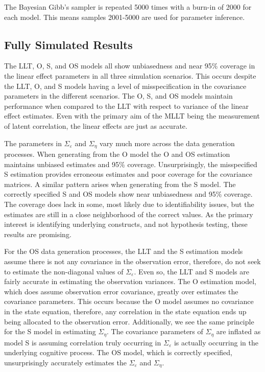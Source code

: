 \documentclass[
]{article}
\begin{document}
The Bayesian Gibb's sampler is repeated 5000 times with a burn-in of 2000 for each model. This means samples 2001-5000 are used for parameter inference.

\hypertarget{fully-simulated-results}{%
\subsection{Fully Simulated Results}\label{fully-simulated-results}}

The LLT, O, S, and OS models all show unbiasedness and near 95\% coverage in the linear effect parameters in all three simulation scenarios. This occurs despite the LLT, O, and S models having a level of misspecification in the covariance parameters in the different scenarios. The O, S, and OS models maintain performance when compared to the LLT with respect to variance of the linear effect estimates. Even with the primary aim of the MLLT being the measurement of latent correlation, the linear effects are just as accurate.

The parameters in \(\Sigma_\varepsilon\) and \(\Sigma_\eta\) vary much more across the data generation processes. When generating from the O model the O and OS estimation maintains unbiased estimates and 95\% coverage. Unsurprisingly, the misspecified S estimation provides erroneous estimates and poor coverage for the covariance matrices. A similar pattern arises when generating from the S model. The correctly specified S and OS models show near unbiasedness and 95\% coverage. The coverage does lack in some, most likely due to identifiability issues, but the estimates are still in a close neighborhood of the correct values. As the primary interest is identifying underlying constructs, and not hypothesis testing, these results are promising.

For the OS data generation processes, the LLT and the S estimation models assume there is not any covariance in the observation error, therefore, do not seek to estimate the non-diagonal values of \(\Sigma_\varepsilon\). Even so, the LLT and S models are fairly accurate in estimating the observation variances. The O estimation model, which does assume observation error covariance, greatly over estimates the covariance parameters. This occurs because the O model assumes no covariance in the state equation, therefore, any correlation in the state equation ends up being allocated to the observation error. Additionally, we see the same principle for the S model in estimating \(\Sigma_\eta\). The covariance parameters of \(\Sigma_\eta\) are inflated as model S is assuming correlation truly occurring in \(\Sigma_\varepsilon\) is actually occurring in the underlying cognitive process. The OS model, which is correctly specified, unsurprisingly accurately estimates the \(\Sigma_\varepsilon\) and \(\Sigma_\eta\).
\end{document}
